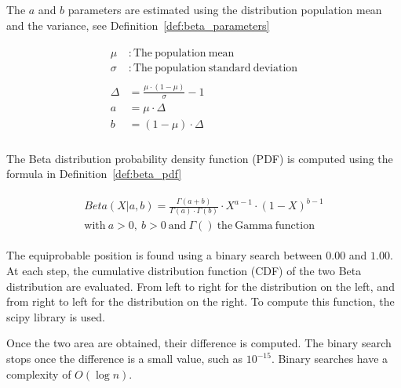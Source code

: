The $a$ and $b$ parameters are estimated using the distribution population mean and the variance, see Definition~\ref{def:beta_parameters}

\begin{definition}
  \begin{gather*}
    \begin{aligned}
      \mu&: \mathrm{The\ population\ mean} \\
      \sigma&: \mathrm{The\ population\ standard\ deviation} \\
       \\
      \Delta &= \frac{\mu \cdot (1 - \mu)}{\sigma} - 1 \\
      a &= \mu \cdot \Delta \\
      b &= (1 - \mu) \cdot \Delta \\
    \end{aligned}
  \end{gather*}
\end{definition}

The Beta distribution probability density function (PDF) is computed using the formula in Definition~\ref{def:beta_pdf}

\begin{definition}
  \begin{gather*}
    \begin{aligned}
      Beta(X|a,b) = \frac{\Gamma(a + b)}{\Gamma(a) \cdot \Gamma(b)} \cdot X^{a-1} \cdot (1 - X)^{b-1}\\
      \mathrm{with\ }a > 0\mathrm{,\ }b > 0\mathrm{\ and\ }\Gamma()\mathrm{\ the\ Gamma\ function}
    \end{aligned}
  \end{gather*}
\end{definition}

The equiprobable position is found using a binary search between $0.00$ and $1.00$.
At each step, the cumulative distribution function (CDF) of the two Beta distribution are evaluated.
From left to right for the distribution on the left, and from right to left for the distribution on the right.
To compute this function, the scipy library is used.

Once the two area are obtained, their difference is computed.
The binary search stops once the difference is a small value, such as $10^{-15}$.
Binary searches have a complexity of $O(\log n)$.

